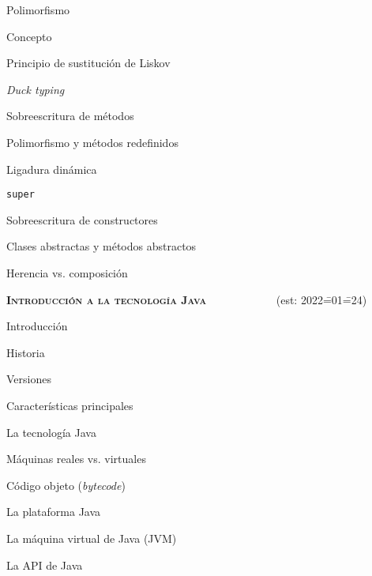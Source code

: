 \begin{longenum}
\begin{longenum}
        \item Polimorfismo
        \begin{longenum}
            \item Concepto
            \item Principio de sustitución de Liskov
            \item \textit{Duck typing}
            \item Sobreescritura de métodos
            \begin{longenum}
                \item Polimorfismo y métodos redefinidos
            \end{longenum}
            \item Ligadura dinámica
            \item \texttt{super}
            \item Sobreescritura de constructores
            \item Clases abstractas y métodos abstractos
        \end{longenum}
        \item Herencia vs. composición
    \end{longenum}
    \item \textbf{\textsc{Introducción a la tecnología Java}} \ \ \ \ \ \ \ \ \ \ \ \ (est: 2022\==01\==24)
    \begin{longenum}
        \item Introducción
        \begin{longenum}
            \item Historia
            \item Versiones
            \item Características principales
        \end{longenum}
        \item La tecnología Java
        \begin{longenum}
            \item Máquinas reales vs. virtuales
            \item Código objeto (\textit{bytecode})
            \item La plataforma Java
            \begin{longenum}
                \item La máquina virtual de Java (JVM)
                \item La API de Java
            \end{longenum}

\end{longenum}
\end{longenum}
\end{longenum}
